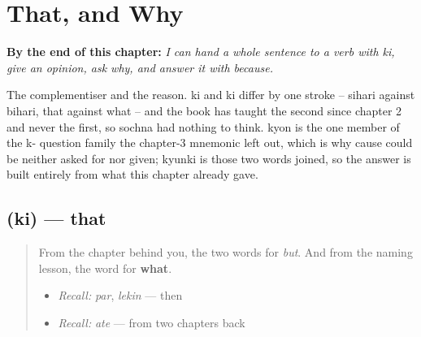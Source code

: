 
\chapter{That, and Why}
\label{ch:pa-that-and-why}

\begin{chapteropening}
\textbf{By the end of this chapter:} \emph{I can hand a whole sentence to a verb with ki, give an opinion, ask why, and answer it with because.}

The complementiser and the reason. ki and ki differ by one stroke -- sihari against bihari, that against what -- and the book has taught the second since chapter 2 and never the first, so sochna had nothing to think. kyon is the one member of the k- question family the chapter-3 mnemonic left out, which is why cause could be neither asked for nor given; kyunki is those two words joined, so the answer is built entirely from what this chapter already gave.
\end{chapteropening}

\section[\texorpdfstring{\pa{ਕਿ} (ki)}{ਕਿ (ki)}]{ (ki) — that}

\label{lesson:PA-C40-ki}



\begin{quote}
From the chapter behind you, the two words for \emph{but}. And from the naming lesson, the word for \textbf{what}.

\begin{itemize}
\raggedright
  \item \emph{Recall:} \emph{par}, \emph{lekin} — then \textbf{}
  \item \emph{Recall:} \emph{ate} — from two chapters back
\end{itemize}
\end{quote}


